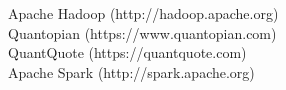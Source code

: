 \documentclass[10pt, conference, compsocconf]{IEEEtran}
\begin{document}
%
%
%
\begin{thebibliography}{1}

Apache Hadoop (http://hadoop.apache.org)\\
Quantopian (https://www.quantopian.com)\\
QuantQuote (https://quantquote.com)\\
Apache Spark (http://spark.apache.org)\\

\end{thebibliography}




\end{document}
